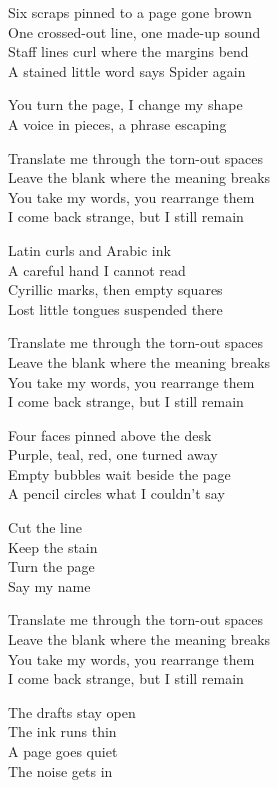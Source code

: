 \begin{lyrics}
Six scraps pinned to a page gone brown\\
One crossed-out line, one made-up sound\\
Staff lines curl where the margins bend\\
A stained little word says Spider again

You turn the page, I change my shape\\
A voice in pieces, a phrase escaping

Translate me through the torn-out spaces\\
Leave the blank where the meaning breaks\\
You take my words, you rearrange them\\
I come back strange, but I still remain

Latin curls and Arabic ink\\
A careful hand I cannot read\\
Cyrillic marks, then empty squares\\
Lost little tongues suspended there

Translate me through the torn-out spaces\\
Leave the blank where the meaning breaks\\
You take my words, you rearrange them\\
I come back strange, but I still remain

Four faces pinned above the desk\\
Purple, teal, red, one turned away\\
Empty bubbles wait beside the page\\
A pencil circles what I couldn’t say

Cut the line\\
Keep the stain\\
Turn the page\\
Say my name

Translate me through the torn-out spaces\\
Leave the blank where the meaning breaks\\
You take my words, you rearrange them\\
I come back strange, but I still remain

The drafts stay open\\
The ink runs thin\\
A page goes quiet\\
The noise gets in
\end{lyrics}

